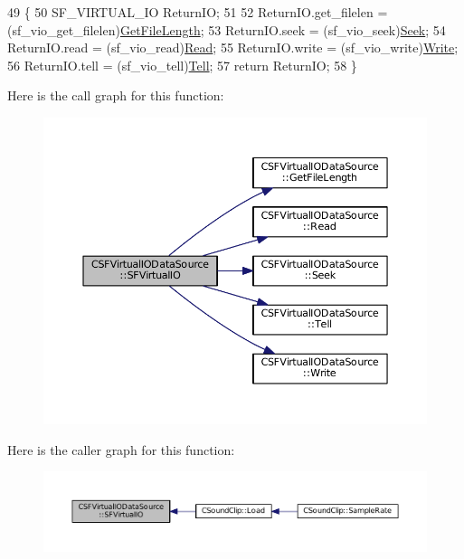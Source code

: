 \begin{DoxyCode}
49                                                        \{
50     SF\_VIRTUAL\_IO ReturnIO;
51     
52     ReturnIO.get\_filelen = (sf\_vio\_get\_filelen)\hyperlink{classCSFVirtualIODataSource_a94ee0d9f4703661ca7f2cad8cf294690}{GetFileLength};   
53     ReturnIO.seek = (sf\_vio\_seek)\hyperlink{classCSFVirtualIODataSource_a04735e135ffc05dd53fce944e772fcfc}{Seek};
54     ReturnIO.read = (sf\_vio\_read)\hyperlink{classCSFVirtualIODataSource_a40021962590f0911d8af1020397fbba1}{Read};
55     ReturnIO.write = (sf\_vio\_write)\hyperlink{classCSFVirtualIODataSource_ac1d38c4c9d8ba3e0a2affd7dd72283ee}{Write};   
56     ReturnIO.tell = (sf\_vio\_tell)\hyperlink{classCSFVirtualIODataSource_aae8e2b59f9753ed1f8baca1561b15962}{Tell};   
57     \textcolor{keywordflow}{return} ReturnIO;
58 \}
\end{DoxyCode}
Here is the call graph for this function\+:\nopagebreak
\begin{figure}[H]
\begin{center}
\leavevmode
\includegraphics[width=350pt]{classCSFVirtualIODataSource_a9c15fbbe734fdfc2af17ca8f424b7e43_cgraph}
\end{center}
\end{figure}
Here is the caller graph for this function\+:\nopagebreak
\begin{figure}[H]
\begin{center}
\leavevmode
\includegraphics[width=350pt]{classCSFVirtualIODataSource_a9c15fbbe734fdfc2af17ca8f424b7e43_icgraph}
\end{center}
\end{figure}
\hypertarget{classCSFVirtualIODataSource_aae8e2b59f9753ed1f8baca1561b15962}{}\label{classCSFVirtualIODataSource_aae8e2b59f9753ed1f8baca1561b15962} 
